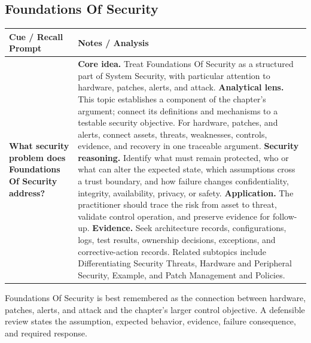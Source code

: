 \documentclass[11pt]{article}
\newcommand{\CornellHeader}{%
\rowcolor{Navy}\color{white}\bfseries Cue / Recall Prompt & \color{white}\bfseries Notes / Analysis\\\hline}
\newcommand{\CornellRow}[2]{%
\cellcolor{CueGray}\RaggedRight\textbf{#1} & \RaggedRight #2\\\hline}
\begin{document}
\subsection*{Foundations Of Security}
\begin{longtable}{>{\RaggedRight\arraybackslash}p{}|>{\RaggedRight\arraybackslash}p{}}
\CornellHeader
\CornellRow{What security problem does Foundations Of Security address?}{\textbf{Core idea.} Treat Foundations Of Security as a structured part of System Security, with particular attention to hardware, patches, alerts, and attack. \textbf{Analytical lens.} This topic establishes a component of the chapter's argument; connect its definitions and mechanisms to a testable security objective. For hardware, patches, and alerts, connect assets, threats, weaknesses, controls, evidence, and recovery in one traceable argument. \textbf{Security reasoning.} Identify what must remain protected, who or what can alter the expected state, which assumptions cross a trust boundary, and how failure changes confidentiality, integrity, availability, privacy, or safety. \textbf{Application.} The practitioner should trace the risk from asset to threat, validate control operation, and preserve evidence for follow-up. \textbf{Evidence.} Seek architecture records, configurations, logs, test results, ownership decisions, exceptions, and corrective-action records. Related subtopics include Differentiating Security Threats, Hardware and Peripheral Security, Example, and Patch Management and Policies.}
\end{longtable}
\begin{topicsummary}
Foundations Of Security is best remembered as the connection between hardware, patches, alerts, and attack and the chapter's larger control objective. A defensible review states the assumption, expected behavior, evidence, failure consequence, and required response.
\end{topicsummary}
\end{document}
